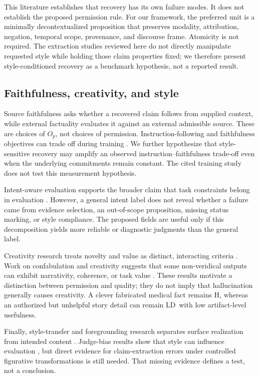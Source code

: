 \documentclass{clv2025}
\newcommand{\LD}{\textsc{LD}}
\newcommand{\Hall}{\textsc{H}}
\begin{document}
This literature establishes that recovery has its own failure modes.
It does not establish the proposed permission rule.
For our framework, the preferred unit is a minimally decontextualized
proposition that preserves modality, attribution, negation, temporal
scope, provenance, and discourse frame.
Atomicity is not required.
The extraction studies reviewed here do not directly manipulate requested
style while holding those claim properties fixed; we therefore present
style-conditioned recovery as a benchmark hypothesis, not a reported
result.

\subsection{Faithfulness, creativity, and style}

Source faithfulness asks whether a recovered claim follows from supplied
context, while external factuality evaluates it against an external
admissible source.
These are choices of $O_p$, not choices of permission.
Instruction-following and faithfulness objectives can trade off during
training \citep{wu_dancing_2024}.
We further hypothesize that style-sensitive recovery may amplify an
observed instruction--faithfulness trade-off even when the underlying
commitments remain constant.
The cited training study does not test this measurement hypothesis.

Intent-aware evaluation supports the broader claim that task constraints
belong in evaluation \citep{hao_faithqa_2025}.
However, a general intent label does not reveal whether a failure came
from evidence selection, an out-of-scope proposition, missing status
marking, or style compliance.
The proposed fields are useful only if this decomposition yields more
reliable or diagnostic judgments than the general label.

Creativity research treats novelty and value as distinct, interacting
criteria \citep{diedrich_are_2015,franceschelli_creativity_2024}.
Work on confabulation and creativity suggests that some non-veridical
outputs can exhibit narrativity, coherence, or task value
\citep{sui_confabulation_2024,jiang_survey_2024}.
These results motivate a distinction between permission and quality; they
do not imply that hallucination generally causes creativity.
A clever fabricated medical fact remains \Hall, whereas an authorized but
unhelpful story detail can remain \LD\ with low artifact-level usefulness.

Finally, style-transfer and foregrounding research separates surface
realization from intended content
\citep{leech_short_style_1981,vanpeer_stylistics_2020,pavlick_empirical_2016,rao_dear_2018,briakou_evaluating_2021}.
Judge-bias results show that style can influence evaluation
\citep{feuer_style_2025}, but direct evidence for claim-extraction errors
under controlled figurative transformations is still needed.
That missing evidence defines a test, not a conclusion.
\FloatBarrier
\end{document}
